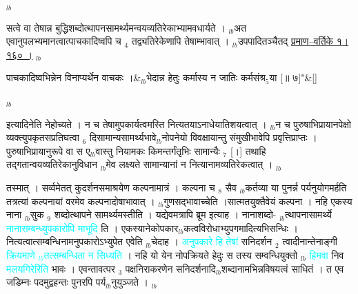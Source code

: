 \documentclass[article,12pt,a4paper]{memoir}%
\newcommand{\quotelemma}[1]{\textcolor{cyan}{#1}}
\newcounter{parCount}
\begin{document}
	  
	  
	  \endgroup
	{\tiny $_{lb}$}

	  
	  \pstart \leavevmode%
	सत्वे वा तेषान्न बुद्धिशब्दोत्थापनसामर्थ्यमन्वयव्यतिरेकाभ्यामवधार्यते । {\tiny $_{lb}$}अत एवानुपलभ्यमानत्वात्पाचकादिष्वपि च {\tiny $_{4}$} तद्व्यतिरेकेणापि तेषाम्भावात् । {\tiny $_{lb}$}उपपादितञ्चैतद् \href{http://sarit.indology.info/?cref=pv.1.160}{प्रमाण–वर्तिके १।१६० ।}
	{}
	\pend%
      {\tiny $_{lb}$}
	  \bigskip
	  \begingroup
	
	    
	    \stanza[\smallbreak]
	  पाचकादिष्वभिन्नेन विनाप्यर्थेन वाचकः ।&{\tiny $_{lb}$}भेदान्न हेतुः कर्मास्य न जातिः कर्मसंश्र{\tiny $_{5}$}या [॥ ७]{\normalfontlatin\large\qquad{}"}\&[\smallbreak]
	  
	  
	  
	  \endgroup
	{\tiny $_{lb}$}

	  
	  \pstart \leavevmode%
	इत्यादिनेति नेहोच्यते । न च तेषामुपकार्यत्वमस्ति नित्यतयाऽनाधेयातिशयत्वात् । {\tiny $_{lb}$}न च पुरुषाभिप्रायानपेक्षो व्यक्त्युपकृतसप्रतिघत्वा {\tiny $_{6}$} दिसामान्यसामर्थ्यभावे{\tiny $_{lb}$}नोपनेयो विवक्षायान्तु संमुखीभावेपि प्रवृत्तिप्राप्तः । पुरुषाभिप्रायानुरूपे वा स ए{\tiny $_{lb}$}वास्तु नियामकः किमन्तर्गंतृभिः सामान्यैः {\tiny $_{7}$} [।] तथाहि तद्गतान्वयव्यतिरेकानुविधान {\tiny $_{lb}$}मेव लक्ष्यते सामान्यानां न नित्यानामव्यतिरेकत्वात् ।
	{}
	\pend%
      {\tiny $_{lb}$}

	  
	  \pstart \leavevmode%
	तस्मात् । सर्व्वमेतत् कुदर्शनसमाश्रयेण कल्पनामात्रं । कल्पना च {\tiny $_{8}$} सैव {\tiny $_{lb}$}कर्तव्या या पुनर्न्न पर्यनुयोगमर्हति तत्रत्यां कल्पनायां वरमेव कल्पनादोषाभावात् । {\tiny $_{lb}$}गुणसद्भावाच्चेति ।सात्मतयुक्तैवेयं कल्पना । नहि एकस्य नाना {\tiny $_{lb}$}सुक {\tiny $_{9}$} \leavevmode{} शब्दोत्थापने सामर्थ्यमस्तीति । यद्येवमत्रापि ब्रूम इत्याह । नानाशब्दो- {\tiny $_{lb}$}त्थापनासामर्थ्ये \quotelemma{नानासम्बन्ध्युपकारोपि माभूदि} \cite[2b10]{vn-msN} ति । एकस्यानेकोपकार{\tiny $_{lb}$}कत्वविरोधाभ्युपगमादित्यभिसन्धिः । नित्यत्वात्सम्बन्धिनामनुपकारोऽभ्युपेत एवेति {\tiny $_{lb}$}चेदाह । \quotelemma{अनुपकारे हि तेषां} \cite[2b10]{vn-msN} सनिदर्शन {\tiny $_{2}$} त्वादीनान्तेनाङ्गी \quotelemma{क्रियमाणे {\tiny $_{lb}$}तत्सम्बन्धिता न सिध्यति} । नहि यो येन नोपक्रियते हेदुः स तस्य सम्वन्धियुक्तो {\tiny $_{lb}$} \leavevmode{} \quotelemma{हिमवा} निव \quotelemma{मलयगिरेरिति} भावः । एवन्तावत्पर {\tiny $_{3}$} पक्षनिराकरणेन सनिदर्शनादि{\tiny $_{lb}$}शब्दानामभिन्नविषयत्वं साधितं । त एव जडिम्नः पदमुद्वहन्तः पुनरपि पर्य{\tiny $_{lb}$}नुयुञ्जते ।
	{}
	\pend%
      {\tiny $_{lb}$}
\end{document}
